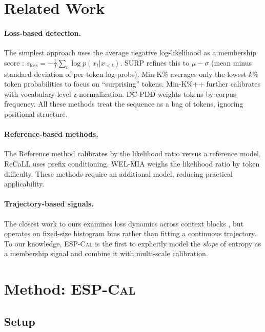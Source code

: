 \documentclass[11pt]{article}
\newcommand{\ours}{\textsc{ESP-Cal}}
\begin{document}
\section{Related Work}
\label{sec:related}

\paragraph{Loss-based detection.}
The simplest approach uses the average negative log-likelihood as a membership score \citep{yeom2018privacy}: $s_{\text{loss}} = -\frac{1}{T}\sum_t \log p(x_t|x_{<t})$.
SURP \citep{carlini2024surp} refines this to $\mu - \sigma$ (mean minus standard deviation of per-token log-probs).
Min-K\% \citep{shi2024detecting} averages only the lowest-$k$\% token probabilities to focus on ``surprising'' tokens.
Min-K\%++ \citep{zhang2024minkpp} further calibrates with vocabulary-level z-normalization.
DC-PDD \citep{zhang2024dcpdd} weights tokens by corpus frequency.
All these methods treat the sequence as a bag of tokens, ignoring positional structure.

\paragraph{Reference-based methods.}
The Reference method \citep{carlini2021extracting} calibrates by the likelihood ratio versus a reference model.
ReCaLL \citep{xie2024recall} uses prefix conditioning.
WEL-MIA \citep{song2024wel} weighs the likelihood ratio by token difficulty.
These methods require an additional model, reducing practical applicability.

\paragraph{Trajectory-based signals.}
The closest work to ours examines loss dynamics across context blocks \citep{meeus2024doclevel}, but operates on fixed-size histogram bins rather than fitting a continuous trajectory.
To our knowledge, \ours{} is the first to explicitly model the \textit{slope} of entropy as a membership signal and combine it with multi-scale calibration.

\section{Method: \ours{}}
\label{sec:method}

\subsection{Setup}
\end{document}
